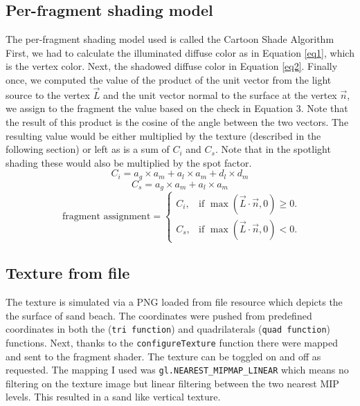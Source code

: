\documentclass[12pt,a4paper]{article}
\begin{document}
\subsection{Per-fragment shading model}
The per-fragment shading model used is called the Cartoon Shade Algorithm \cite{shade}
First, we had to calculate the illuminated diffuse color as in Equation \ref{eq1}, which is the vertex color. Next, the shadowed diffuse color in Equation \ref{eq2}. Finally once, we computed the value of the product of the unit vector from the light source to the vertex $\overrightarrow{L}$ and the unit vector
normal to the surface at the vertex  $\overrightarrow{n}$, we assign to the fragment the value based on the check in Equation 3. Note that the result of this product is the cosine of the angle between the two vectors. The resulting value would be either multiplied by the texture (described in the following section) or left as is a sum of $C_i$ and  $C_s$. Note that in the spotlight shading these would also be multiplied by the spot factor.
\begin{equation}\label{eq1}
C_i = a_g \times a_m + a_l \times a_m + d_l \times d_m  
\end{equation}
\begin{equation}\label{eq2}
C_s =  a_g \times a_m + a_l \times a_m
\end{equation}
\begin{equation}\label{eq3}
\text{ fragment assignment} =\begin{cases}
    C_i, & \text{if $\max(\overrightarrow{L} \cdot \overrightarrow{n}, 0)\geq0$}.\\
    C_s, & \text{if $\max(\overrightarrow{L} \cdot \overrightarrow{n}, 0)<0$}.
  \end{cases}
\end{equation}

\subsection{Texture from file}
The texture is simulated via a PNG loaded from file resource which depicts the the surface of sand beach. The coordinates were pushed from predefined coordinates in both the  (\texttt{tri function{}}) and quadrilaterals (\texttt{quad function{}}) functions. Next, thanks to the \texttt{configureTexture} function there were mapped and sent to the fragment shader. The texture can be toggled on and off as requested. The mapping I used was \texttt{gl.NEAREST\_MIPMAP\_LINEAR} which means no filtering on the texture image but linear filtering between the two nearest MIP levels. This resulted in a sand like vertical texture.
\end{document}
